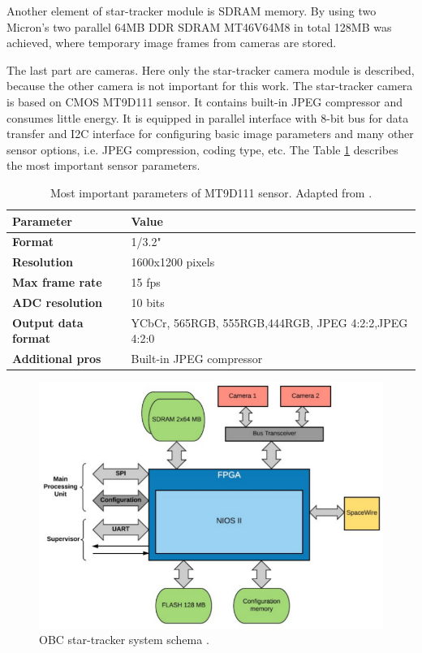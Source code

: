 \documentclass[12pt,a4paper,oneside]{article}
\begin{document}
Another element of star-tracker module is SDRAM memory. By using two Micron's two parallel 64MB DDR SDRAM MT46V64M8 in total 128MB was achieved, where temporary image frames from cameras are stored.

The last part are cameras. Here only the star-tracker camera module is described, because the other camera is not important for this work. The star-tracker camera is based on CMOS MT9D111 sensor. It contains built-in JPEG compressor and consumes little energy. It is equipped in parallel interface with 8-bit bus for data transfer and I2C interface for configuring basic image parameters and many other sensor options, i.e. JPEG compression, coding type, etc. The Table \ref{tab:obc-camera} describes the most important sensor parameters.


\begin{table}[!htbp]
\centering
\begin{tabular}{|p{5cm}|p{5cm}|}
\hline 
\textbf{Parameter} & \textbf{Value} \\ 
\hline 
\textbf{Format} & 1/3.2" \\ 
\hline 
\textbf{Resolution} & 1600x1200 pixels \\ 
\hline 
\textbf{Max frame rate} & 15 fps \\ 
\hline 
\textbf{ADC resolution} & 10 bits \\ 
\hline 
\textbf{Output data format} & YCbCr, 565RGB, 555RGB,\newline 444RGB, JPEG 4:2:2,\newline JPEG 4:2:0 \\ 
\hline 
\textbf{Additional pros} & Built-in JPEG compressor \\ 
\hline 
\end{tabular} 
\caption{Most important parameters of MT9D111 sensor. Adapted from \citet{gaska2016obc}.}
\label{tab:obc-camera}
\end{table}

\begin{figure}[!htbp]
\includegraphics[scale=0.5]{obc_startracker.png}
\centering
\caption{OBC star-tracker system schema \cite{gaska2016obc}.}
\label{fig:obc-startracker}
\end{figure}
\end{document}
